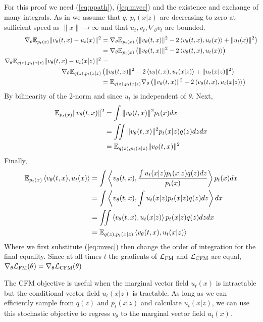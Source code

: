 \documentclass[10pt]{article}
\theoremstyle{plain}
\theoremstyle{definition}
\theoremstyle{remark}
\newcommand{\LFM}[0]{\gL_{\rm FM}}
\newcommand{\LCFM}[0]{\gL_{\rm CFM}}
\begin{document}
\begin{proofE}
For this proof we need (\ref{eq:ppath}), (\ref{eq:mvec}) and the existence and exchange of many integrals. As in \citet{lipman_flow_2022} we assume that $q$, $p_t(x | z)$ are decreasing to zero at sufficient speed as $\|x\|\to \infty$ and that $u_t, v_t, \nabla_\theta v_t$ are bounded.
\begin{align*}
\nabla_\theta \mathbb{E}_{p_t(x)} \|v_\theta (t,x) - u_t(x)\|^2 &= \nabla_\theta \mathbb{E}_{p_t(x)}\left (\|v_\theta (t,x)\|^2 - 2 \left \langle  v_\theta (t,x), u_t(x) \right \rangle + \|u_t(x)\|^2  \right )\\
&= \nabla_\theta \mathbb{E}_{p_t(x)} \left (\|v_\theta (t,x)\|^2 - 2 \left \langle  v_\theta (t,x), u_t(x) \right \rangle \right ) \\
\nabla_\theta \mathbb{E}_{q(z), p_t(x | z)} \|v_\theta (t,x) - u_t(x| z)\|^2 &= \\
\qquad \nabla_\theta \mathbb{E}_{q(z), p_t(x | z)} &\left (\|v_\theta (t,x)\|^2 - 2 \left \langle  v_\theta (t,x), u_t(x| z) \right \rangle + \|u_t(x| z)\|^2 \right ) \\
&= \mathbb{E}_{q(z), p_t(x | z)}\nabla_\theta \left (\|v_\theta (t,x)\|^2 - 2 \left \langle  v_\theta (t,x), u_t(x| z) \right \rangle \right )
\end{align*}
By bilinearity of the 2-norm and since $u_t$ is independent of $\theta$. Next,
\begin{align*}
\mathbb{E}_{p_t(x)} \|v_\theta (t,x)\|^2 
&= \int \|v_\theta (t,x)\|^2 p_t(x) dx \\
&= \iint \|v_\theta (t,x)\|^2 p_t(x| z) q(z) dz dx \\
&= \mathbb{E}_{q(z), p_t(x | z)} \|v_\theta (t,x)\|^2
\end{align*}
Finally,
\begin{align*}
\mathbb{E}_{p_t(x)} \left \langle  v_\theta (t,x), u_t(x) \right \rangle
&= \int \left \langle  v_\theta (t,x), \frac{\int u_t(x | z) p_t(x | z) q(z) dz}{p_t(x)} \right \rangle p_t(x) dx \\
&= \int \left \langle  v_\theta (t,x), \int u_t(x | z) p_t(x | z) q(z) dz\right \rangle dx \\
&= \iint \left \langle  v_\theta (t,x), u_t(x | z) \right \rangle p_t(x | z) q(z) dz dx \\
&= \mathbb{E}_{q(z), p_t(x | z)} \left \langle  v_\theta (t,x), u_t(x| z) \right \rangle
\end{align*}
Where we first substitute (\ref{eq:mvec}) then change the order of integration for the final equality. Since at all times $t$ the gradients of $\LFM$ and $\LCFM$ are equal, $\nabla_\theta \LFM(\theta) = \nabla_\theta \LCFM(\theta)$
\end{proofE}
The CFM objective is useful when the marginal vector field $u_t(x)$ is intractable but the conditional vector field $u_t(x | z)$ is tractable. As long as we can efficiently sample from $q(z)$ and $p_t(x|z)$ and calculate $u_t(x|z)$, we can use this stochastic objective to regress $v_\theta$ to the marginal vector field $u_t(x)$.
\end{document}
